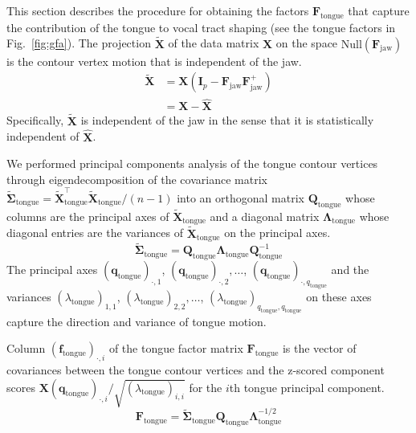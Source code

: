 \documentclass[preprint]{JASAnew}\usepackage[]{graphicx}\usepackage[]{color}
\begin{document}
This section describes the procedure for obtaining the factors $\mathbf{F}_\text{tongue}$ that capture the contribution of the tongue to vocal tract shaping  (see the tongue factors in Fig.~\ref{fig:gfa}). 
% 
The projection $\mathbf{\tilde{X}}$ of the data matrix $\mathbf{X}$ on the space $\mathrm{Null}(\mathbf{F}_\text{jaw})$ is the contour vertex motion that is independent of the jaw.
%
\begin{align} \label{eq:XXX}
\mathbf{\tilde{X}} 
&= \mathbf{X} \left( \mathbf{I}_p - \mathbf{F}_\text{jaw}\mathbf{F}_\text{jaw}^+ \right) \\
&= \mathbf{X} - \mathbf{\hat{X}} 
\end{align}
%
Specifically, $\mathbf{\tilde{X}}$ is independent of the jaw in the sense that it is statistically independent of $\mathbf{\hat{X}}$. 
%





We performed principal components analysis of the tongue contour vertices through eigendecomposition of the covariance matrix $\boldsymbol{\tilde{\Sigma}}_\text{tongue} = \mathbf{\tilde{X}}_\text{tongue}^\intercal \mathbf{\tilde{X}}_\text{tongue}/(n-1)$ into an orthogonal matrix $\mathbf{Q}_\text{tongue}$ whose columns are the principal axes of $\mathbf{\tilde{X}}_\text{tongue}$ and a diagonal matrix $\boldsymbol{\Lambda}_\text{tongue}$ whose diagonal entries are the variances of $\mathbf{\tilde{X}}_\text{tongue}$ on the principal axes.
% 
\begin{equation}
\boldsymbol{\tilde{\Sigma}}_\text{tongue} = \mathbf{Q}_\text{tongue} \boldsymbol{\Lambda}_\text{tongue} \mathbf{Q}_\text{tongue}^{-1}
\end{equation}
%
The principal axes $(\mathbf{q}_\text{tongue})_{\cdot,1}$, $(\mathbf{q}_\text{tongue})_{\cdot,2}, \ldots$, $(\mathbf{q}_\text{tongue})_{\cdot,q_\text{tongue}}$ and the variances $(\lambda_\text{tongue})_{1,1}$, $(\lambda_\text{tongue})_{2,2}, \ldots$, $(\lambda_\text{tongue})_{q_\text{tongue},q_\text{tongue}}$ on these axes capture the direction and variance of tongue motion.


Column $(\mathbf{f}_\text{tongue})_{\cdot,i}$ of the tongue factor matrix $\mathbf{F}_\text{tongue}$ is the vector of covariances between the tongue contour vertices and the z-scored component scores $\mathbf{X} (\mathbf{q}_\text{tongue})_{\cdot,i} / \sqrt{(\lambda_\text{tongue})_{i,i}}$ for the $i$th tongue principal component. 
%
\begin{equation}
\mathbf{F}_\text{tongue}
 = \boldsymbol{\tilde{\Sigma}}_\text{tongue} \mathbf{Q}_\text{tongue} \boldsymbol{\Lambda}_\text{tongue}^{-1/2}
\end{equation}
\end{document}
